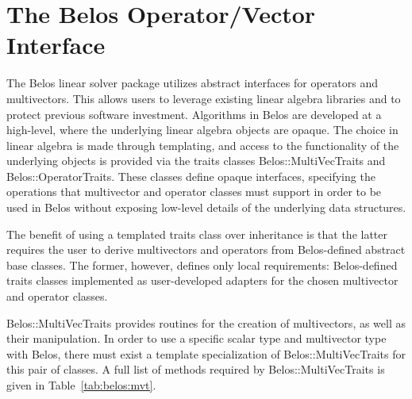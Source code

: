\section{The Belos Operator/Vector Interface}
\label{sec:belos:opvec}

The Belos linear solver package utilizes abstract interfaces for operators and
multivectors. This allows users to leverage existing linear algebra libraries and to
protect previous software investment. Algorithms in Belos are developed at a high-level,
where the underlying linear algebra objects are opaque. The choice in linear algebra is
made through templating, and access to the functionality of the underlying objects is
provided via the traits classes Belos::MultiVecTraits and Belos::OperatorTraits.
These classes define opaque interfaces, specifying the operations that multivector and
operator classes must support in order to be used in Belos without exposing low-level
details of the underlying data structures.

The benefit of using a templated traits class over inheritance is that the latter requires
the user to derive multivectors and operators from Belos-defined abstract
base classes. The former, however, defines only local requirements: Belos-defined traits
classes implemented as user-developed adapters for the chosen multivector and operator
classes.

Belos::MultiVecTraits provides routines for the creation of multivectors, as well as
their manipulation. In order to use a specific scalar type and multivector type with
Belos, there must exist a template specialization of Belos::MultiVecTraits for this
pair of classes. A full list of methods required by Belos::MultiVecTraits is given in
Table~\ref{tab:belos:mvt}.

